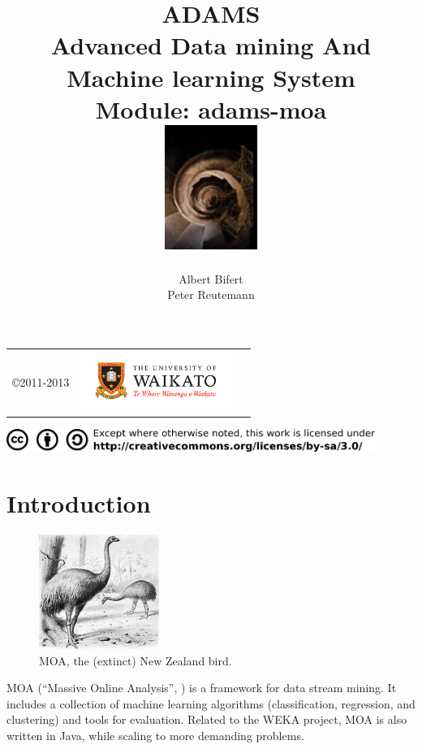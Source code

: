 \documentclass[a4paper]{book}
\title{
  \textbf{ADAMS} \\
  {\Large \textbf{A}dvanced \textbf{D}ata mining \textbf{A}nd \textbf{M}achine
  learning \textbf{S}ystem} \\
  {\Large Module: adams-moa} \\
  \vspace{1cm}
  \includegraphics[width=3cm]{images/moa_logo.png} \\
}
\author{
  Albert Bifert \\
  Peter Reutemann
}
\begin{document}
\begin{titlepage}
\maketitle

\thispagestyle{empty}
\center
\begin{table}[b]
	\begin{tabular}{c l l}
		\parbox[c][2cm]{2cm}{\copyright 2011-2013} &
		\parbox[c][2cm]{5cm}{\includegraphics[width=5cm]{images/coat_of_arms.pdf}} \\
	\end{tabular}
	\includegraphics[width=12cm]{images/cc.png} \\
\end{table}

\end{titlepage}

\tableofcontents
\listoffigures

\chapter{Introduction}

\begin{figure}
  \vspace{-20pt}
  \centering
  \includegraphics[width=0.35\textwidth]{images/moa-bird.png}
  \caption{MOA, the (extinct) New Zealand bird.}
  \label{moa-bird}
\end{figure}  

MOA (``Massive Online Analysis'', \cite{moa}) is a framework for data stream mining. It 
includes a collection of machine learning algorithms (classification, 
regression, and clustering) and tools for evaluation. Related to the WEKA 
project, MOA is also written in Java, while scaling to more demanding problems.
\end{document}

